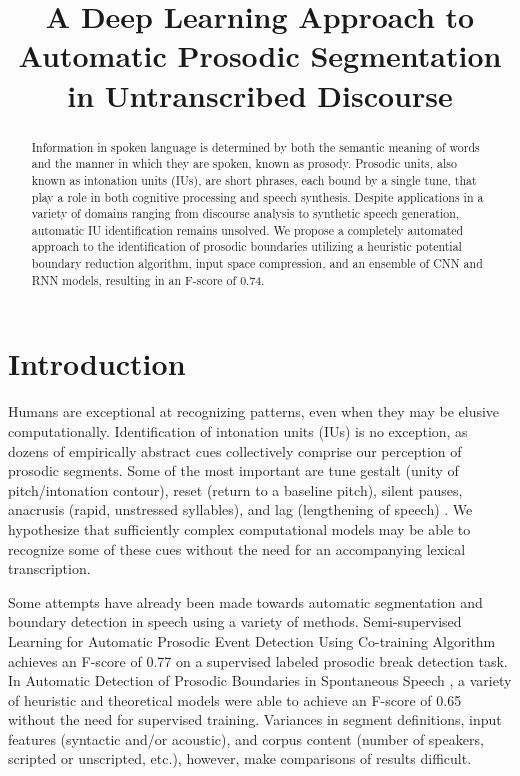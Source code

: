 \documentclass[conference]{IEEEtran}
\begin{document}
\title{A Deep Learning Approach to Automatic Prosodic Segmentation in Untranscribed Discourse\\
}

\author{
\and
{}

}

\maketitle

\begin{abstract}
Information in spoken language is determined by both the semantic meaning of words and the manner in which they are spoken, known as prosody. Prosodic units, also known as intonation units (IUs), are short phrases, each bound by a single tune, that play a role in both cognitive processing and speech synthesis. Despite applications in a variety of domains ranging from discourse analysis to synthetic speech generation, automatic IU identification remains unsolved. We propose a completely automated approach to the identification of prosodic boundaries utilizing a heuristic potential boundary reduction algorithm, input space compression, and an ensemble of CNN and RNN models, resulting in an F-score of 0.74.
\end{abstract}

\section{Introduction}
Humans are exceptional at recognizing patterns, even when they may be elusive computationally. Identification of intonation units (IUs) is no exception, as dozens of empirically abstract cues collectively comprise our perception of prosodic segments. Some of the most important are tune gestalt (unity of pitch/intonation contour), reset (return to a baseline pitch), silent pauses, anacrusis (rapid, unstressed syllables), and lag (lengthening of speech) \cite{b1}. We hypothesize that sufficiently complex computational models may be able to recognize some of these cues without the need for an accompanying lexical transcription.

Some attempts have already been made towards automatic segmentation and boundary detection in speech using a variety of methods. Semi-supervised Learning for Automatic Prosodic Event Detection Using Co-training Algorithm \cite{b2} achieves an F-score of 0.77 on a supervised labeled prosodic break detection task. In Automatic Detection of Prosodic Boundaries in Spontaneous Speech \cite{b3}, a variety of heuristic and theoretical models were able to achieve an F-score of 0.65 without the need for supervised training. Variances in segment definitions, input features (syntactic and/or acoustic), and corpus content (number of speakers, scripted or unscripted, etc.), however, make comparisons of results difficult.
\end{document}

